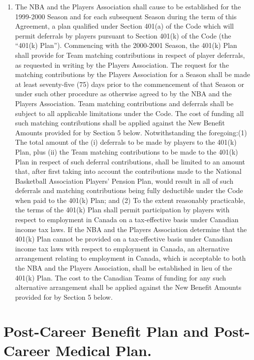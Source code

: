 \documentclass[
]{book}
\providecommand{\tightlist}{%
  \setlength{\itemsep}{0pt}\setlength{\parskip}{0pt}}
\begin{document}
\begin{enumerate}
\def\labelenumi{(\alph{enumi})}
\tightlist
\item
  The NBA and the Players Association shall cause to be established for the 1999-2000 Season and for each subsequent Season during the term of this Agreement, a plan qualified under Section 401(a) of the Code which will permit deferrals by players pursuant to Section 401(k) of the Code (the ``401(k) Plan''). Commencing with the 2000-2001 Season, the 401(k) Plan shall provide for Team matching contributions in respect of player deferrals, as requested in writing by the Players Association. The request for the matching contributions by the Players Association for a Season shall be made at least seventy-five (75) days prior to the commencement of that Season or under such other procedure as otherwise agreed to by the NBA and the Players Association. Team matching contributions and deferrals shall be subject to all applicable limitations under the Code. The cost of funding all such matching contributions shall be applied against the New Benefit Amounts provided for by Section 5 below. Notwithstanding the foregoing:(1) The total amount of the (i) deferrals to be made by players to the 401(k) Plan, plus (ii) the Team matching contributions to be made to the 401(k) Plan in respect of such deferral contributions, shall be limited to an amount that, after first taking into account the contributions made to the National Basketball Association Players' Pension Plan, would result in all of such deferrals and matching contributions being fully deductible under the Code when paid to the 401(k) Plan; and (2) To the extent reasonably practicable, the terms of the 401(k) Plan shall permit participation by players with respect to employment in Canada on a tax-effective basis under Canadian income tax laws. If the NBA and the Players Association determine that the 401(k) Plan cannot be provided on a tax-effective basis under Canadian income tax laws with respect to employment in Canada, an alternative arrangement relating to employment in Canada, which is acceptable to both the NBA and the Players Association, shall be established in lieu of the 401(k) Plan. The cost to the Canadian Teams of funding for any such alternative arrangement shall be applied against the New Benefit Amounts provided for by Section 5 below.
\end{enumerate}

\hypertarget{post-career-benefit-plan-and-post-career-medical-plan.}{%
\section{Post-Career Benefit Plan and Post-Career Medical Plan.}\label{post-career-benefit-plan-and-post-career-medical-plan.}}
\end{document}
